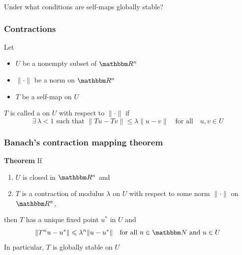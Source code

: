 \begin{frame}

    Under what conditions are self-maps globally stable?

\end{frame}

\begin{frame}
    \frametitle{Contractions}
    
    Let 
    \begin{itemize}
        \item $U$ be a nonempty subset of $\RR^n$
    \vspace{0.3em}
    \vspace{0.3em}
        \item $\| \cdot \|$ be a norm on $\RR^n$
    \vspace{0.3em}
    \vspace{0.3em}
        \item $T$ be a self-map on $U$

    \end{itemize}

    \vspace{0.3em}
    \vspace{0.3em}
    \vspace{0.3em}
    $T$ is called a  on $U$ with respect
    to $\| \cdot \|$ if 
    \begin{equation*}
        \text{$\exists \, \lambda < 1$ such that }
        \| Tu - Tv \| \leq \lambda \| u - v \| \quad \text{for all} \quad u, v \in U
    \end{equation*}


    


\end{frame}




\begin{frame}
    \frametitle{Banach's contraction mapping theorem}
    
    {\bf Theorem} If 
    \begin{enumerate}
        \item $U$ is closed in $\RR^n$ and
        \item $T$ is a contraction of modulus $\lambda$ on $U$
        with respect to some norm $\| \cdot \|$ on $\RR^n$,
    \end{enumerate}
    then $T$ has a unique fixed point $u^*$ in $U$ and 
    \begin{equation*}
        \| T^n u - u^* \| \leq \lambda^n \| u - u^* \|
        \quad \text{for all } n \in \NN \text{ and } u \in U
    \end{equation*}
    In particular, $T$ is globally stable on $U$


\end{frame}


